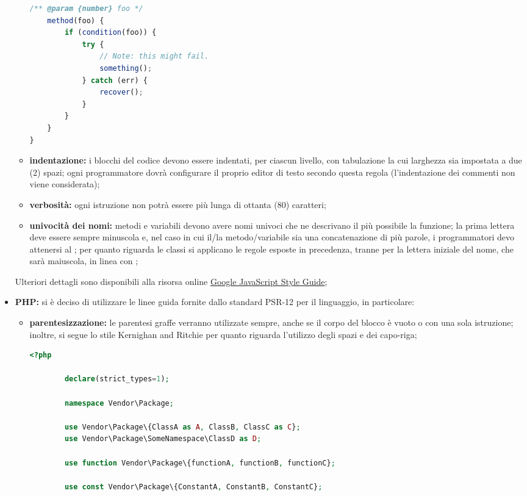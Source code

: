\begin{itemize}
\begin{itemize}
\begin{lstlisting}[language=JavaScript,captionpos=b,caption={Esempio per la sintassi JavaScript}]
	/** @param {number} foo */
	method(foo) {
		if (condition(foo)) {
			try {
				// Note: this might fail.
				something();
			} catch (err) {
				recover();
			}
		}
	}
}
								\end{lstlisting}
								\item \textbf{indentazione:} i blocchi del codice devono essere indentati, per ciascun livello, con tabulazione la cui larghezza sia impostata a due (2) spazi; ogni programmatore dovrà configurare il proprio editor di testo secondo questa regola (l'indentazione dei commenti non viene considerata);
								\item \textbf{verbosità:} ogni istruzione non potrà essere più lunga di ottanta (80) caratteri;
								\item \textbf{univocità dei nomi:} metodi e variabili devono avere nomi univoci che ne descrivano il più possibile la funzione; la prima lettera deve essere sempre minuscola e, nel caso in cui il/la metodo/variabile sia una concatenazione di più parole, i programmatori devo attenersi al ; per quanto riguarda le classi si applicano le regole esposte in precedenza, tranne per la lettera iniziale del nome, che sarà maiuscola, in linea con ;
							\end{itemize}
							Ulteriori dettagli sono disponibili alla risorsa online \href{https://google.github.io/styleguide/jsguide.html}{Google JavaScript Style Guide};
						\item \textbf{PHP:} si è deciso di utilizzare le linee guida fornite dallo standard PSR-12 per il linguaggio, in particolare:
							\begin{itemize}
								\item \textbf{parentesizzazione:} le parentesi graffe verranno utilizzate sempre, anche se il corpo del blocco è vuoto o con una sola istruzione; inoltre, si segue lo stile Kernighan and Ritchie per quanto riguarda l'utilizzo degli spazi e dei capo-riga;
								\begin{lstlisting}[language=php,captionpos=b,caption={Esempio per la sintassi PHP}]
<?php

		declare(strict_types=1);
	
		namespace Vendor\Package;
	
		use Vendor\Package\{ClassA as A, ClassB, ClassC as C};
		use Vendor\Package\SomeNamespace\ClassD as D;
	
		use function Vendor\Package\{functionA, functionB, functionC};
	
		use const Vendor\Package\{ConstantA, ConstantB, ConstantC};
	

\end{lstlisting}
\end{itemize}
\end{itemize}
